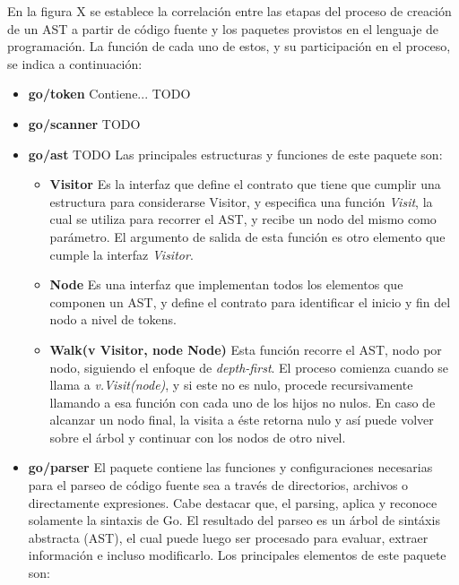 En la figura X se establece la correlación entre las etapas del proceso de creación de un AST a partir de código fuente y los paquetes provistos en el lenguaje de programación.
La función de cada uno de estos, y su participación en el proceso, se indica a continuación:
\begin{itemize}
  \item \textbf{go/token} Contiene... TODO
  
  \item \textbf{go/scanner} TODO
  
  \item \textbf{go/ast} TODO
  Las principales estructuras y funciones de este paquete son:
  \begin{itemize}
    \item \textbf{Visitor} Es la interfaz que define el contrato que tiene que cumplir una estructura para considerarse Visitor, y especifica una función \textit{Visit}, la cual se utiliza para recorrer el AST, y recibe un nodo del mismo como parámetro.
    El argumento de salida de esta función es otro elemento que cumple la interfaz \textit{Visitor}.

    \item \textbf{Node} Es una interfaz que implementan todos los elementos que componen un AST, y define el contrato para identificar el inicio y fin del nodo a nivel de tokens.

    \item \textbf{Walk(v Visitor, node Node)} Esta función recorre el AST, nodo por nodo, siguiendo el enfoque de \textit{depth-first}.
    El proceso comienza cuando se llama a \textit{v.Visit(node)}, y si este no es nulo, procede recursivamente llamando a esa función con cada uno de los hijos no nulos.
    En caso de alcanzar un nodo final, la visita a éste retorna nulo y así puede volver sobre el árbol y continuar con los nodos de otro nivel.
  \end{itemize}
  
  \item \textbf{go/parser} El paquete contiene las funciones y configuraciones necesarias para el parseo de código fuente sea a través de directorios, archivos o directamente expresiones. Cabe destacar que, el parsing, aplica y reconoce solamente la sintaxis de Go.
  El resultado del parseo es un árbol de sintáxis abstracta (AST), el cual puede luego ser procesado para evaluar, extraer información e incluso modificarlo.
  Los principales elementos de este paquete son:


\end{itemize}

